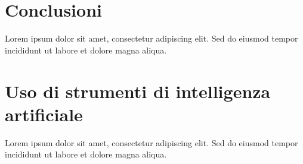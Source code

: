 \documentclass[conference]{IEEEtran}
\begin{document}
\section{Conclusioni}
Lorem ipsum dolor sit amet, consectetur adipiscing elit. Sed do eiusmod tempor
incididunt ut labore et dolore magna aliqua.

\section*{Uso di strumenti di intelligenza artificiale}
Lorem ipsum dolor sit amet, consectetur adipiscing elit. Sed do eiusmod tempor
incididunt ut labore et dolore magna aliqua.



\end{document}
